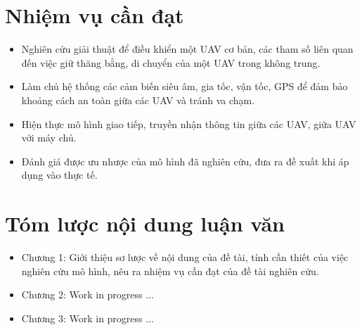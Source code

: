     \section{Nhiệm vụ cần đạt}
    \begin{itemize}
        \item Nghiên cứu giải thuật để điều khiển một UAV cơ bản, các tham số liên quan đến việc giữ thăng bằng, di chuyển của một UAV trong không trung.
        \item Làm chủ hệ thống các cảm biến siêu âm, gia tốc, vận tốc, GPS để đảm bảo khoảng cách an toàn giữa các UAV và tránh va chạm.
        \item Hiện thực mô hình giao tiếp, truyền nhận thông tin giữa các UAV, giữa UAV với máy chủ.
        \item Đánh giá được ưu nhược của mô hình đã nghiên cứu, đưa ra đề xuất khi áp dụng vào thực tế.
    \end{itemize}

    \section{Tóm lược nội dung luận văn}
        \begin{itemize}
            \item Chương 1: Giới thiệu sơ lược về nội dung của đề tài, tính cần thiết của việc nghiên cứu mô hình, nêu ra nhiệm vụ cần đạt của đề tài nghiên cứu.
            \item Chương 2: Work in progress ...
            \item Chương 3: Work in progress ...
        \end{itemize}

